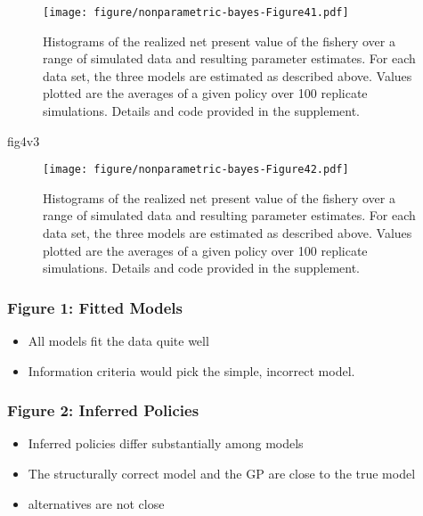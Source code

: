 \documentclass[author-year, review]{elsarticle} %
\makeatletter
\newenvironment{Shaded}{}{}
\newcommand{\NormalTok}[1]{{#1}}
\def\maxwidth{\ifdim\Gin@nat@width>\linewidth\linewidth
\else\Gin@nat@width\fi}
\let\Oldincludegraphics\includegraphics
\renewcommand{\includegraphics}[1]{\Oldincludegraphics[width=\maxwidth]{#1}}
\makeatother
\begin{document}
\begin{figure}[htbp]
\centering
\texttt{[image: figure/nonparametric-bayes-Figure41.pdf]}
\caption{Histograms of the realized net present value of the fishery
over a range of simulated data and resulting parameter estimates. For
each data set, the three models are estimated as described above. Values
plotted are the averages of a given policy over 100 replicate
simulations. Details and code provided in the supplement.}
\end{figure}

\begin{Shaded}
\begin{Highlighting}[]
\NormalTok{fig4v3}
\end{Highlighting}
\end{Shaded}

\begin{figure}[htbp]
\centering
\texttt{[image: figure/nonparametric-bayes-Figure42.pdf]}
\caption{Histograms of the realized net present value of the fishery
over a range of simulated data and resulting parameter estimates. For
each data set, the three models are estimated as described above. Values
plotted are the averages of a given policy over 100 replicate
simulations. Details and code provided in the supplement.}
\end{figure}

\subsubsection{Figure 1: Fitted Models}\label{figure-1-fitted-models}

\begin{itemize}
\itemsep1pt\parskip0pt
\item
  All models fit the data quite well
\item
  Information criteria would pick the simple, incorrect model.
\end{itemize}

\subsubsection{Figure 2: Inferred
Policies}\label{figure-2-inferred-policies}

\begin{itemize}
\itemsep1pt\parskip0pt
\item
  Inferred policies differ substantially among models
\item
  The structurally correct model and the GP are close to the true model
\item
  alternatives are not close
\end{itemize}
\end{document}
